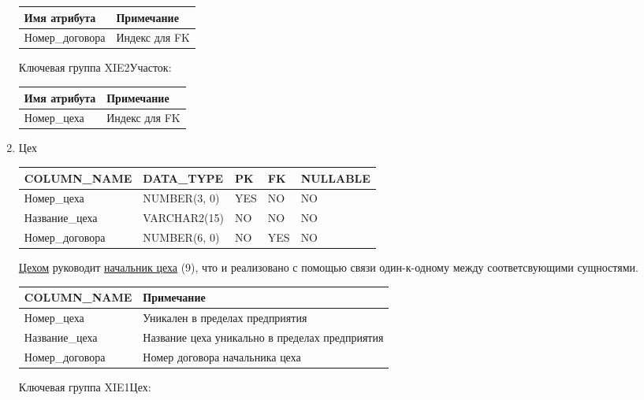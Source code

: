 \begin{enumerate}
\begin{tabular}{|p{4cm}|p{5cm}|}
        {\bf Имя атрибута} & {\bf Примечание} \\ \hline
        Номер\_договора & Индекс для FK \\ \hline

    \end{tabular}

    Ключевая группа XIE2Участок:

    \begin{tabular}{|p{4cm}|p{5cm}|} \hline

        {\bf Имя атрибута} & {\bf Примечание} \\ \hline
        Номер\_цеха & Индекс для FK \\ \hline

    \end{tabular}

    \item{Цех}

    \begin{tabular}{|p{4cm}|p{3cm}|p{1cm}|p{1cm}|p{2cm}|} \hline

        {\bf COLUMN\_NAME} & {\bf DATA\_TYPE} & {\bf PK} & {\bf FK} & {\bf NULLABLE} \\ \hline
        Номер\_цеха & NUMBER(3, 0) & YES & NO & NO \\ \hline
        Название\_цеха & VARCHAR2(15) & NO & NO & NO \\ \hline
        Номер\_договора & NUMBER(6, 0) & NO & YES & NO \\ \hline

    \end{tabular}

    \underline{Цехом} руководит \underline{начальник цеха} (9), что и реализовано с помощью связи один-к-одному между соответсвующими сущностями.

    \begin{tabular}{|p{4cm}|p{5cm}|} \hline

        {\bf COLUMN\_NAME} & {\bf Примечание} \\ \hline
        Номер\_цеха & Уникален в пределах предприятия \\ \hline
        Название\_цеха & Название цеха уникально в пределах предприятия \\ \hline
        Номер\_договора & Номер договора начальника цеха \\ \hline

    \end{tabular}

    Ключевая группа XIE1Цех:


\end{enumerate}
